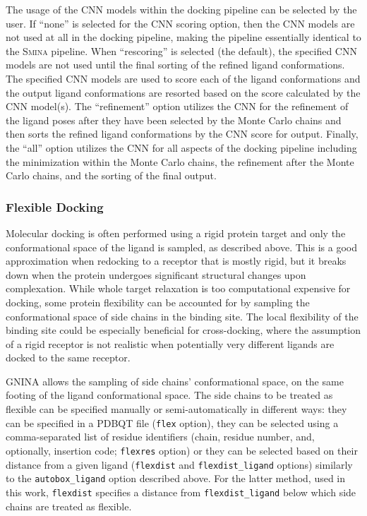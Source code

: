 \documentclass[journal=jcisd8,manuscript=article]{achemso}
\begin{document}
The usage of the CNN models within the docking pipeline can be selected by the user. If ``none'' is selected for the CNN scoring option, then the CNN models are not used at all in the docking pipeline, making the pipeline essentially identical to the \textsc{Smina} pipeline. When ``rescoring'' is selected (the default), the specified CNN models are not used until the final sorting of the refined ligand conformations. The specified CNN models are used to score each of the ligand conformations and the output ligand conformations are resorted based on the score calculated by the CNN model(s). The ``refinement'' option utilizes the CNN for the refinement of the ligand poses after they have been selected by the Monte Carlo chains and then sorts the refined ligand conformations by the CNN score for output. Finally, the ``all'' option utilizes the CNN for all aspects of the docking pipeline including the minimization within the Monte Carlo chains, the refinement after the Monte Carlo chains, and the sorting of the final output. 
\subsubsection{Flexible Docking}

Molecular docking is often performed using a rigid protein target and only the conformational space of the ligand is sampled, as described above. This is a good approximation when redocking to a receptor that is mostly rigid, but it breaks down when the protein undergoes significant structural changes upon complexation.\cite{Teague2003} While whole target relaxation is too computational expensive for docking, some protein flexibility can be accounted for by sampling the conformational space of side chains in the binding site.\cite{Zhao2008} The local flexibility of the binding site could be especially beneficial for cross-docking, where the assumption of a rigid receptor is not realistic when potentially very different ligands are docked to the same receptor.

GNINA allows the sampling of side chains' conformational space, on the same footing of the ligand conformational space. The side chains to be treated as flexible can be specified manually or semi-automatically in different ways: they can be specified in a PDBQT file (\texttt{flex} option), they can be selected using a comma-separated list of residue identifiers (chain, residue number, and, optionally, insertion code; \texttt{flexres} option) or they can be selected based on their distance from a given ligand (\texttt{flexdist} and \texttt{flexdist\_ligand} options) similarly to the \texttt{autobox\_ligand} option described above. For the latter method, used in this work, \texttt{flexdist} specifies a distance from \texttt{flexdist\_ligand} below which side chains are treated as flexible.
\end{document}

